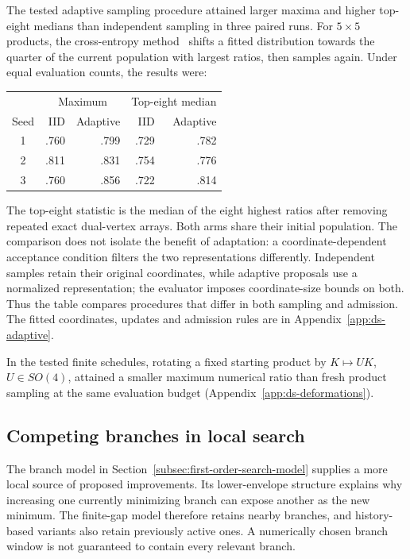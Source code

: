 The tested adaptive sampling procedure attained larger maxima and
higher top-eight medians than independent sampling in three paired runs.
For $5\times5$ products, the cross-entropy method~\cite{dsDeBoer2005}
shifts a fitted distribution towards the quarter of the current population
with largest ratios, then samples again. Under equal evaluation counts,
the results were:
\begin{center}
\begin{tabular}{crrrr}
\hline
 & \multicolumn{2}{c}{Maximum} & \multicolumn{2}{c}{Top-eight median}\\
Seed & IID & Adaptive & IID & Adaptive\\
\hline
1 & .760 & .799 & .729 & .782\\
2 & .811 & .831 & .754 & .776\\
3 & .760 & .856 & .722 & .814\\
\hline
\end{tabular}
\end{center}
The top-eight statistic is the median of the eight highest ratios after
removing repeated exact dual-vertex arrays. Both arms share their initial
population. The comparison does not isolate the benefit of adaptation:
a coordinate-dependent acceptance condition filters the two
representations differently. Independent samples retain their original
coordinates, while adaptive proposals use a normalized representation;
the evaluator imposes coordinate-size bounds on both. Thus the table
compares procedures that differ in both sampling and admission. The
fitted coordinates, updates and admission rules are in
Appendix~\ref{app:ds-adaptive}.

In the tested finite schedules, rotating a fixed starting product by
$K\mapsto UK$, $U\in SO(4)$, attained a smaller maximum numerical ratio
than fresh product sampling at the same evaluation budget
(Appendix~\ref{app:ds-deformations}).

\subsection{Competing branches in local search}
\label{subsec:black-box-datascience-finite-budget-optimization}

The branch model in Section~\ref{subsec:first-order-search-model}
supplies a more local source of proposed improvements. Its lower-envelope
structure explains why increasing one currently minimizing branch can
expose another as the new minimum. The
finite-gap model therefore retains nearby branches, and history-based
variants also retain previously active ones. A numerically chosen branch
window is not guaranteed to contain every relevant branch.


